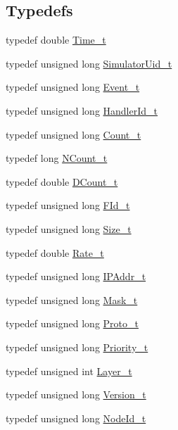 \subsection*{Typedefs}
\begin{CompactItemize}
\item 
typedef double \hyperlink{common-defs_8hpp_80b23eab88362163e2edd1a8b8238ef1}{Time\_\-t}
\item 
typedef unsigned long \hyperlink{common-defs_8hpp_16fb8086ae850e7968b56e59bfaa7f35}{SimulatorUid\_\-t}
\item 
typedef unsigned long \hyperlink{common-defs_8hpp_791d339cfe093569d92ea6526b10a377}{Event\_\-t}
\item 
typedef unsigned long \hyperlink{common-defs_8hpp_175449b3edd44f9b188a394a3a8f73fa}{HandlerId\_\-t}
\item 
typedef unsigned long \hyperlink{common-defs_8hpp_bdd4d02aefa61ef2e943e2c6a09566c6}{Count\_\-t}
\item 
typedef long \hyperlink{common-defs_8hpp_31e0a34115bd71ae4a58792bf9a3dc0a}{NCount\_\-t}
\item 
typedef double \hyperlink{common-defs_8hpp_5ded3df8359d37f8dc0cf27e278512dd}{DCount\_\-t}
\item 
typedef unsigned long \hyperlink{common-defs_8hpp_d52ae22edd21f664ee80fd139812d0df}{FId\_\-t}
\item 
typedef unsigned long \hyperlink{common-defs_8hpp_e631ad947c732f67fcea3e3ab2450129}{Size\_\-t}
\item 
typedef double \hyperlink{common-defs_8hpp_d63eeae723a00a223db6ad616379eb2c}{Rate\_\-t}
\item 
typedef unsigned long \hyperlink{common-defs_8hpp_780b971097907a80d4d34b4a32eceed8}{IPAddr\_\-t}
\item 
typedef unsigned long \hyperlink{common-defs_8hpp_af75856d762bf510c1154d2a7c3513f0}{Mask\_\-t}
\item 
typedef unsigned long \hyperlink{common-defs_8hpp_49d9c9c2901bafeb04c3b5e74c455314}{Proto\_\-t}
\item 
typedef unsigned long \hyperlink{common-defs_8hpp_79f4b76bcd848dd7d2871f7702e54018}{Priority\_\-t}
\item 
typedef unsigned int \hyperlink{common-defs_8hpp_6b55d1d138de1a78feb4a6a917b2ec43}{Layer\_\-t}
\item 
typedef unsigned long \hyperlink{common-defs_8hpp_813d8523655f78183719cbc0e7c82541}{Version\_\-t}
\item 
typedef unsigned long \hyperlink{common-defs_8hpp_b5bc3678439fa7c82ce3d7d6c59fe456}{NodeId\_\-t}

\end{CompactItemize}
